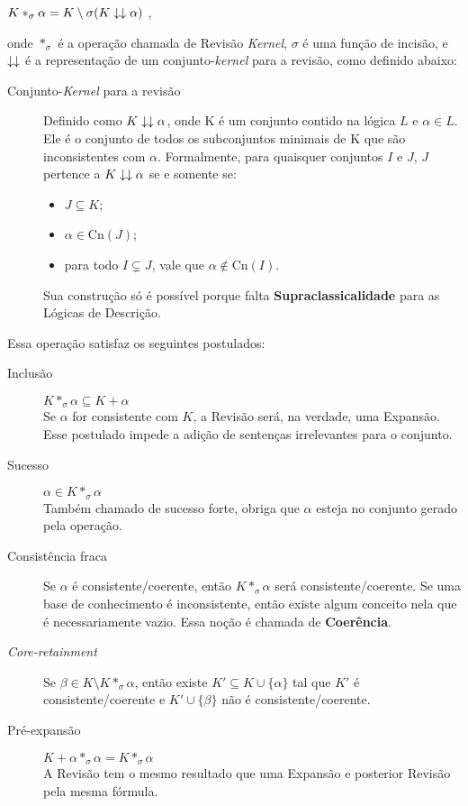 \begin{center}
	$ K \ast_\sigma \alpha = K \setminus \sigma (K \downarrow\downarrow \alpha)$ ,
\end{center}

onde $ \ast_{\sigma} $ é a operação chamada de Revisão \textit{Kernel}, $ \sigma $ é uma função de incisão, e $ \downarrow\downarrow $ é a representação de um conjunto-\textit{kernel} para a revisão, como definido abaixo:

\begin{description}
	\item[Conjunto-\textit{Kernel} para a revisão] Definido como $ K \downarrow\downarrow \alpha $, onde K é um conjunto contido na lógica $ L $ e $ \alpha \in L $. Ele é o conjunto de todos os subconjuntos minimais de K que são inconsistentes com $ \alpha $. Formalmente, para quaisquer conjuntos $ I $ e $ J $, $ J $ pertence a $ K \downarrow\downarrow \alpha $ se e somente se:
	\begin{itemize}
		\item $ J \subseteq K $;
		\item $ \alpha \in \text{Cn}(J) $;
		\item para todo $ I \subsetneq J $, vale que $ \alpha \notin \text{Cn}(I) $.
	\end{itemize}
	Sua construção só é possível porque falta \textbf{Supraclassicalidade} para as Lógicas de Descrição.  
\end{description}

Essa operação satisfaz os seguintes postulados:

\begin{description}
	\item[Inclusão] $ K \ast_\sigma \alpha \subseteq K + \alpha $ \\
	Se $ \alpha $ for consistente com $ K $, a Revisão será, na verdade, uma Expansão. Esse postulado impede a adição de sentenças irrelevantes para o conjunto.
	\item[Sucesso] $ \alpha \in K \ast_\sigma \alpha $\\
	Também chamado de sucesso forte, obriga que $ \alpha $ esteja no conjunto gerado pela operação.
	\item[Consistência fraca] Se $ \alpha $ é consistente/coerente, então $ K \ast_\sigma \alpha $ será consistente/coerente. Se uma base de conhecimento é inconsistente, então existe algum conceito nela que é necessariamente vazio. Essa noção é chamada de \textbf{Coerência}.
	\item[\textit{Core-retainment}] Se $ \beta \in K \setminus K \ast_\sigma \alpha $, então existe $ K' \subseteq K \cup \{\alpha\} $ tal que $ K' $ é consistente/coerente e $ K' \cup \{\beta\}$ não é consistente/coerente.
	\item[Pré-expansão] $ K + \alpha \ast_\sigma \alpha = K \ast_\sigma \alpha $ \\
	A Revisão tem o mesmo resultado que uma Expansão e posterior Revisão pela mesma fórmula. 
\end{description}

